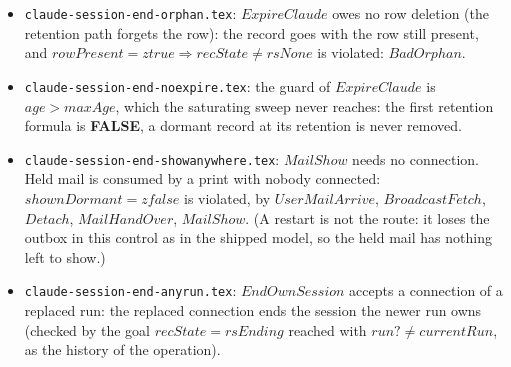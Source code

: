 \documentclass[a4paper,10pt,fleqn]{article}
\begin{document}
\begin{itemize}
    $NewHello$ with the owner-checked $ReleaseTty$ of the shipped model: the
    invariant \textbf{holds} over its 89,153 states.  This is the positive control:
    the owner check is what keeps the new session's name.
  \item \texttt{claude-session-end-orphan.tex}: $ExpireClaude$ owes no row deletion
    (the retention path forgets the row): the record goes with the row still
    present, and $rowPresent = ztrue \Rightarrow recState \neq rsNone$ is violated:
    $BadOrphan$.
  \item \texttt{claude-session-end-noexpire.tex}: the guard of $ExpireClaude$ is
    $age > maxAge$, which the saturating sweep never reaches: the first retention
    formula is \textbf{FALSE}, a dormant record at its retention is never
    removed.
  \item \texttt{claude-session-end-showanywhere.tex}: $MailShow$ needs no
    connection.  Held mail is consumed by a print with nobody connected:
    $shownDormant = zfalse$ is violated, by $UserMailArrive$, $BroadcastFetch$, $Detach$, $MailHandOver$,
    $MailShow$.  (A restart is not the route: it loses the outbox in this control
    as in the shipped model, so the held mail has nothing left to show.)
  \item \texttt{claude-session-end-anyrun.tex}: $EndOwnSession$ accepts a
    connection of a replaced run: the replaced connection ends the session the
    newer run owns (checked by the goal $recState = rsEnding$ reached with
    $run? \neq currentRun$, as the history of the operation).
\end{itemize}
\end{document}
